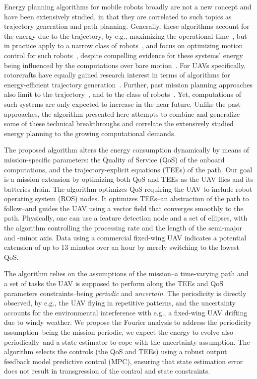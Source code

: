 \documentclass[letterpaper,10pt,conference]{ieeeconf}
\begin{document}
Energy planning algorithms for mobile robots broadly are not a new concept and have been extensively studied, in that they are correlated to such topics as trajectory generation and path planning. Generally, these algorithms account for the energy due to the trajectory, by e.g., maximizing the operational time~\cite{wahab2015energy}, but in practice apply to a narrow class of robots~\cite{kim2005energy}, and focus on optimizing motion control for such robots~\cite{kim2008minimum}, despite compelling evidence for these systems' energy being influenced by the computations over bare motion~\cite{mei2004energy}. For UAVs specifically, rotorcrafts have equally gained research interest in terms of algorithms for energy-efficient trajectory generation~\cite{morbidi2016minimum,kreciglowa2017energy}. Further, past mission planning approaches also limit to the trajectory~\cite{mei2004energy,mei2005case,mei2006deployment}, and to the class of robots~\cite{sadrpour2013mission,sadrpour2013experimental}. Yet, computations of such systems are only expected to increase in the near future. Unlike the past approaches, the algorithm presented here attempts to combine and generalize some of these technical breakthroughs and correlate the extensively studied energy planning to the growing computational demands.

The proposed algorithm alters the energy consumption dynamically by means of mission-specific parameters: the Quality of Service (QoS) of the onboard computations, and the trajectory-explicit equations (TEEs) of the path. Our goal is a mission extension by optimizing both QoS and TEEs as the UAV flies and its batteries drain. The algorithm optimizes QoS requiring the UAV to include robot operating system (ROS) nodes. It optimizes TEEs--an abstraction of the path to follow--and guides the UAV using a vector field that converges smoothly to the path. Physically, one can use a feature detection node and a set of ellipses, with the algorithm controlling the processing rate and the length of the semi-major and -minor axis. Data using a commercial fixed-wing UAV indicates a potential extension of up to 13 minutes over an hour by merely switching to the lowest QoS.

The algorithm relies on the assumptions of the mission--a time-varying path and a set of tasks the UAV is supposed to perform along the TEEs and QoS parameters constraints--being \emph{periodic} and \emph{uncertain}. The periodicity is directly observed, by e.g., the UAV flying in repetitive patterns, and the uncertainty accounts for the environmental interference with e.g., a fixed-wing UAV drifting due to windy weather. We propose the Fourier analysis to address the periodicity assumption--being the mission periodic, we expect the energy to evolve also periodically--and a state estimator to cope with the uncertainty assumption. The algorithm selects the controls (the QoS and TEEs) using a robust output feedback model predictive control (MPC), ensuring that state estimation error does not result in transgression of the control and state constraints.
\end{document}
